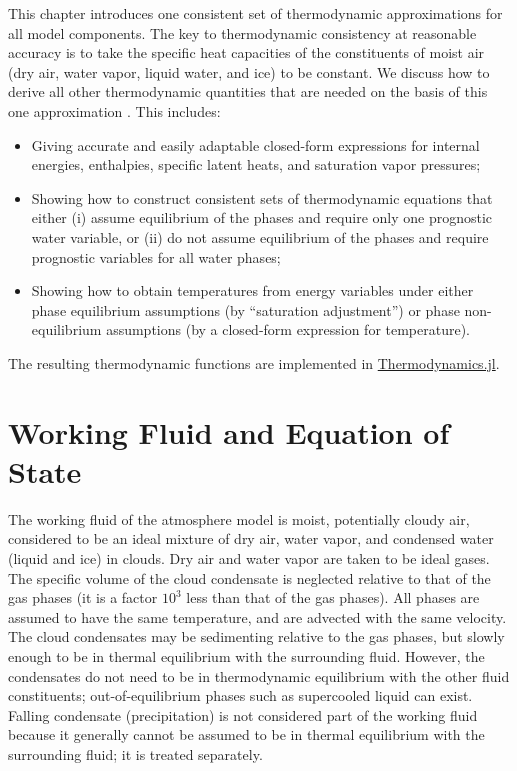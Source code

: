 \documentclass{report}
\begin{document}
This chapter introduces one consistent set of thermodynamic approximations for all model components. The key to thermodynamic consistency at reasonable accuracy is to take the specific heat capacities of the constituents of moist air (dry air, water vapor, liquid water, and ice) to be constant. We discuss how to derive all other thermodynamic quantities that are needed on the basis of this one approximation \citep[cf.][]{Romps08a,Marquet16a}. This includes: 
\begin{itemize}
    \item Giving accurate and easily adaptable closed-form expressions for internal energies, enthalpies, specific latent heats, and saturation vapor pressures;
    \item Showing how to construct consistent sets of thermodynamic equations that either (i) assume equilibrium of the phases and require only one prognostic water variable, or (ii) do not assume equilibrium of the phases and require prognostic variables for all water phases;
    \item Showing how to obtain temperatures from energy variables under either phase equilibrium assumptions (by ``saturation adjustment'') or phase non-equilibrium assumptions (by a closed-form expression for temperature).
\end{itemize}
The resulting thermodynamic functions are implemented in \href{https://github.com/climate-machine/CLIMA/tree/master/src/Common/Thermodynamics}{Thermodynamics.jl}.

\section{Working Fluid and Equation of State}

The working fluid of the atmosphere model is moist, potentially cloudy air, considered to be an ideal mixture of dry air, water vapor, and condensed water (liquid and ice) in clouds. Dry air and water vapor are taken to be ideal gases. The specific volume of the cloud condensate is neglected relative to that of the gas phases (it is a  factor $10^{3}$ less than that of the gas phases). All phases are assumed to have the same temperature, and are advected with the same velocity. The cloud condensates may be sedimenting relative to the gas phases, but slowly enough to be in thermal equilibrium with the surrounding fluid. However, the condensates do not need to be in thermodynamic equilibrium with the other fluid constituents; out-of-equilibrium phases such as supercooled liquid can exist. Falling condensate (precipitation) is not considered part of the working fluid because it generally cannot be assumed to be in thermal equilibrium with the surrounding fluid; it is treated separately.
\end{document}
